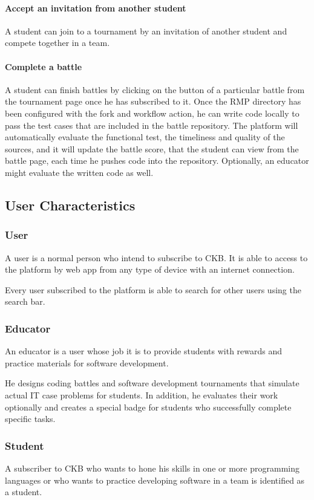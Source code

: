 \paragraph{Accept an invitation from another student}
A student can join to a tournament by an invitation of another student and compete together in a team.

\paragraph{Complete a battle}
A student can finish battles by clicking on the button of a particular battle from the tournament page once he has subscribed to it. Once the RMP directory has been configured with the fork and workflow action, he can write code 
locally to pass the test cases that are included in the battle repository. The platform will automatically evaluate the functional test, the timeliness and quality of the sources, and it will update the battle score, that the student 
can view from the battle page, each time he pushes code into the repository. Optionally, an educator might evaluate the written code as well.

\subsection{User Characteristics}

\subsubsection{User}
A user is a normal person who intend to subscribe to CKB. It is able to access to the platform by web app from any type of device with an internet connection.

Every user subscribed to the platform is able to search for other users using the search bar.

\subsubsection{Educator}
An educator is a user whose job it is to provide students with rewards and practice materials for software development.

He designs coding battles and software development tournaments that simulate actual IT case problems for students. In addition, he evaluates their work optionally and creates a special badge for students who successfully complete 
specific tasks.

\subsubsection{Student}
A subscriber to CKB who wants to hone his skills in one or more programming languages or who wants to practice developing software in a team is identified as a student.

